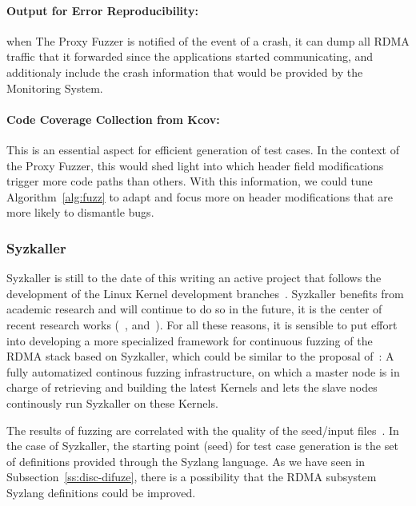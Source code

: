 \paragraph{Output for Error Reproducibility:} when The Proxy Fuzzer is notified of the event of a crash, it can dump all
RDMA traffic that it forwarded since the applications started communicating, and additionaly include the crash information
that would be provided by the Monitoring System.

\paragraph{Code Coverage Collection from Kcov:} This is an essential aspect for efficient generation of test cases.
In the context of the Proxy Fuzzer, this would shed light into which header field modifications trigger more
code paths than others. With this information, we could tune Algorithm~\ref{alg:fuzz} to adapt and focus
more on header modifications that are more likely to dismantle bugs.

\subsubsection{Syzkaller}

Syzkaller is still to the date of this writing an active project that follows the development of the Linux Kernel development
branches~\cite{shiIndustryPracticeCoverageguided2019}. Syzkaller benefits from academic
research and will continue to do so in the future, it is the center of recent research works
(~\cite{kim2020hfl},\cite{hongNovelDynamicAnalysis2021} and~\cite{pailoorMoonShineOptimizingOS2018}).
For all these reasons, it is sensible to put effort into developing a more specialized framework for continuous fuzzing
of the RDMA stack based on Syzkaller, which could be similar to the proposal of~\cite{shiIndustryPracticeCoverageguided2019}:
A fully automatized continous fuzzing infrastructure, on which a master node is in charge of retrieving and building the latest Kernels
and lets the slave nodes continously run Syzkaller on these Kernels.

The results of fuzzing are correlated with the quality of the seed/input files~\cite{liangFuzzingStateArt2018}.
In the case of Syzkaller, the starting point (seed) for test case generation is the set of definitions
provided through the Syzlang language. As we have seen in Subsection~\ref{ss:disc-difuze}, there is
a possibility that the RDMA subsystem Syzlang definitions could be improved.
